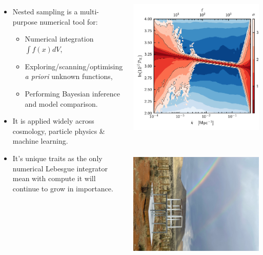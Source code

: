 \documentclass[aspectratio=169]{beamer}
\begin{document}
\begin{frame}
    \vspace{-0.1\textheight}
    \begin{columns}
    \begin{itemize}
        \item Nested sampling is a multi-purpose numerical tool for:
            \begin{itemize}
                \item Numerical integration $\int f(x) dV$,
                \item Exploring/scanning/optimising \textit{a priori} unknown functions,
                \item Performing Bayesian inference and model comparison.
            \end{itemize}
        \item It is applied widely across cosmology, particle physics \& machine learning.
        \item It's unique traits as the only numerical Lebesgue integrator mean with compute it will continue to grow in importance.
    \end{itemize}
    \includegraphics[height=0.6\textwidth]{figures/pps_both}%
    \includegraphics[height=0.6\textwidth]{figures/REACH_2}%

\end{columns}
\end{frame}
\end{document}
